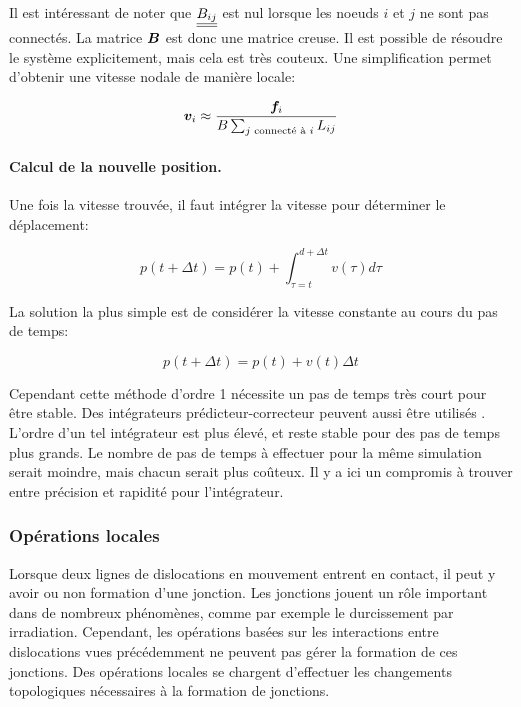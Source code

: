 \documentclass[11pt,class=article,float=false,crop=false]{standalone}
\begin{document}
Il est intéressant de noter que $\underline{\underline{B_{ij} } }$ est nul lorsque les noeuds $i$ et $j$ ne sont pas connectés. La matrice $\bm{B}$ est donc une matrice creuse. Il est possible de résoudre le système explicitement, mais cela est très couteux. Une simplification  permet d'obtenir une vitesse nodale de manière locale:

\begin{equation}
\bm{v}_i \approx \frac{\bm{f}_i}{B\sum_{j\text{ connecté à } i } L_{ij}}
\end{equation}





\paragraph{Calcul de la nouvelle position.}
Une fois la vitesse trouvée, il faut intégrer la vitesse pour déterminer le déplacement:

\begin{equation}
p(t+\Delta t) = p(t) + \int_{\tau=t}^{d+\Delta t} v(\tau) d\tau
\end{equation}

La solution la plus simple est de considérer la vitesse constante au cours du pas de temps:

\begin{equation}
p(t+\Delta t) = p(t) + v(t)\Delta t
\end{equation}

Cependant cette méthode d'ordre 1 nécessite un pas de temps très court pour être stable. Des intégrateurs prédicteur-correcteur peuvent aussi être utilisés . L'ordre d'un tel intégrateur est plus élevé, et reste stable pour des pas de temps plus grands. Le nombre de pas de temps à effectuer pour la même simulation serait moindre, mais chacun serait plus coûteux. Il y a ici un compromis à trouver entre précision et rapidité pour l'intégrateur.


\subsubsection{Opérations locales}

Lorsque deux lignes de dislocations en mouvement entrent en contact, il peut y avoir ou non formation d'une jonction. Les jonctions jouent un rôle important dans de nombreux phénomènes, comme par exemple le durcissement par irradiation. Cependant, les opérations basées sur les interactions entre dislocations vues précédemment ne peuvent pas gérer la formation de ces jonctions. Des opérations locales se chargent d'effectuer les changements topologiques nécessaires à la formation de jonctions. 
\end{document}
